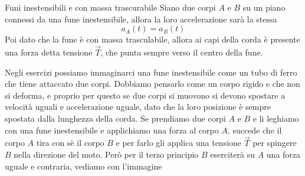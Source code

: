 \documentclass{rapport}
\begin{document}
\newpage

\begin{definizione}{Funi inestensibili e con massa trascurabile}{}
  Siano due corpi $A$ e $B$ su un piano connessi da una fune inestensibile, allora la loro accelerazione sarà la stessa 
  \[
  a_A(t) = a_B(t)
  \]
  Poi dato che la fune è con massa trasculabile, allora ai capi della corda è presente una forza detta tensione $\vec{T}$, che punta sempre verso il centro della fune. 
\end{definizione}

Negli esercizi possiamo immaginarci una fune inestensibile come un tubo di ferro che tiene attaccato due corpi. Dobbiamo pensarlo come un corpo rigido e che non si deforma, e proprio per questo se due corpi si muovono si devono spostare a velocità uguali e accelerazione uguale, dato che la loro posizione è sempre spostata dalla lunghezza della corda. Se prendiamo due corpi $A$ e $B$ e li leghiamo con una fune inestensibile e applichiamo una forza al corpo $A$, succede che il corpo $A$ tira con sè il corpo $B$ e per farlo gli applica una tensione $\vec{T}$ per spingere $B$ nella direzione del moto. Però per il terzo principio $B$ eserciterà su $A$ una forza uguale e contraria, vediamo con l'immagine 

\begin{figure}[h]
    \centering
\end{figure}
\end{document}
